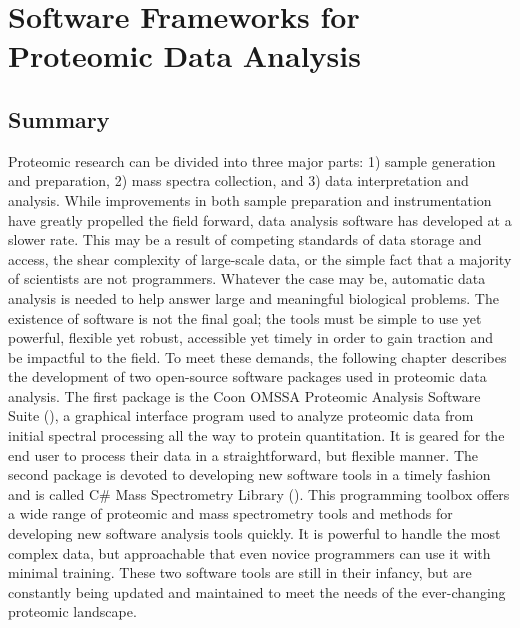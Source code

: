 \chapter{Software Frameworks for Proteomic Data Analysis}

\section{Summary}
Proteomic research can be divided into three major parts: 1) sample generation and preparation, 2) mass spectra collection, and 3) data interpretation and analysis. While improvements in both sample preparation and instrumentation have greatly propelled the field forward, data analysis software has developed at a slower rate. This may be a result of competing standards of data storage and access, the shear complexity of large-scale data, or the simple fact that a majority of scientists are not programmers. Whatever the case may be, automatic data analysis is needed to help answer large and meaningful biological problems. The existence of software is not the final goal; the tools must be simple to use yet powerful, flexible yet robust, accessible yet timely in order to gain traction and be impactful to the field. To meet these demands, the following chapter describes the development of two open-source software packages used in proteomic data analysis. The first package is the Coon OMSSA Proteomic Analysis Software Suite (\compass{}), a graphical interface program used to analyze proteomic data from initial spectral processing all the way to protein quantitation. It is geared for the end user to process their data in a straightforward, but flexible manner. The second package is devoted to developing new software tools in a timely fashion and is called C\# Mass Spectrometry Library (\csmsl{}). This programming toolbox offers a wide range of proteomic and mass spectrometry tools and methods for developing new software analysis tools quickly. It is powerful to handle the most complex data, but approachable that even novice programmers can use it with minimal training. These two software tools are still in their infancy, but are constantly being updated and maintained to meet the needs of the ever-changing proteomic landscape.

